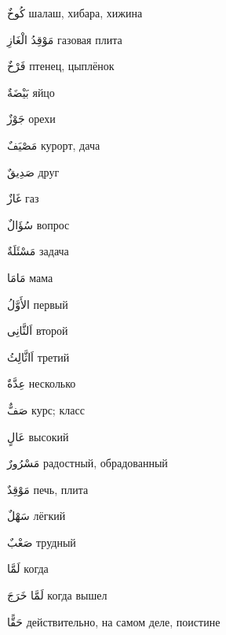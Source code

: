 \documentclass[a5paper]{article}
\newcommand\textstyleDropCaps[1]{#1}
\newcommand\textstyleCaptioncharacters[1]{#1}
\begin{document}
\textstyleCaptioncharacters{كُوخٌ }\textstyleDropCaps{шалаш, хибара, хи­жина‎}

\textstyleCaptioncharacters{مَوْقِدُ الْغَازِ }\textstyleDropCaps{газовая плита‎}

\textstyleCaptioncharacters{فَرْخٌ }\textstyleDropCaps{птенец, цыплёнок‎}

\textstyleCaptioncharacters{بَيْضَةٌ }\textstyleDropCaps{яйцо‎}

\textstyleCaptioncharacters{جَوْزٌ }\textstyleDropCaps{орехи‎}

\textstyleCaptioncharacters{مَصْيَفٌ }\textstyleDropCaps{курорт, дача‎}

\textstyleCaptioncharacters{صَدِيقٌ }\textstyleDropCaps{друг‎}

\textstyleCaptioncharacters{غَازٌ }\textstyleDropCaps{газ‎}

\textstyleCaptioncharacters{سُؤَالٌ }\textstyleDropCaps{вопрос‎}

\textstyleCaptioncharacters{مَسْئَلَةٌ }\textstyleDropCaps{задача‎}

\textstyleCaptioncharacters{مَامَا }\textstyleDropCaps{мама‎}

\textstyleCaptioncharacters{الأَوَّلُ }\textstyleDropCaps{первый‎}

\textstyleCaptioncharacters{اَلثَّانِى }\textstyleDropCaps{второй‎}

\textstyleCaptioncharacters{اَاثَّالِثُ }\textstyleDropCaps{третий‎}

\textstyleCaptioncharacters{عِدَّةٌ }\textstyleDropCaps{несколько‎}

\textstyleCaptioncharacters{صَفٌّ }\textstyleDropCaps{курс; класс‎}

\textstyleCaptioncharacters{عَالٍ }\textstyleDropCaps{высокий‎}

\textstyleCaptioncharacters{مَسْرُورٌ }\textstyleDropCaps{радостный, обра­дованный‎}

\textstyleCaptioncharacters{مَوْقِدٌ }\textstyleDropCaps{печь, плита‎}

\textstyleCaptioncharacters{سَهْلٌ }\textstyleDropCaps{лёгкий‎}

\textstyleCaptioncharacters{صَعْبٌ }\textstyleDropCaps{трудный‎}

\textstyleCaptioncharacters{لَمَّا }\textstyleDropCaps{когда‎}

\textstyleCaptioncharacters{لَمَّا خَرَجَ }\textstyleDropCaps{когда вышел‎}

\textstyleCaptioncharacters{حَقًّا }\textstyleDropCaps{действительно, на самом деле, поистине‎}
\end{document}
